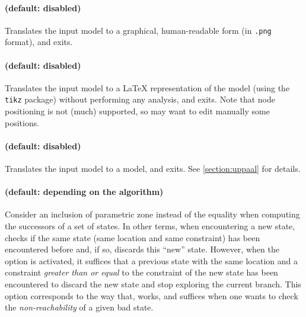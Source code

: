\paragraph{ (default: disabled)}
Translates the input model to a graphical, human-readable form (in \texttt{.png} format), and exits.

\paragraph{ (default: disabled)}
Translates the input model to a \LaTeX{} representation of the model (using the \texttt{tikz} package) without performing any analysis, and exits.
Note that node positioning is not (much) supported, so may want to edit manually some positions.

\paragraph{ (default: disabled)}
Translates the input model to a \uppaal{} model, and exits.
See \cref{section:uppaal} for details.



\paragraph{ (default: depending on the algorithm)}
Consider an inclusion of parametric zone instead of the equality when computing the successors of a set of states.
In other terms, when encountering a new state, \imitator{} checks if the same state (same location and same constraint) has been encountered before and, if so, discards this ``new'' state.
However, when the  option is activated, it suffices that a previous state with the same location and a constraint \emph{greater than or equal} to the constraint of the new state has been encountered to discard the new state and stop exploring the current branch.
This option corresponds to the way that, \eg{} \hytech{} works, and suffices when one wants to check the \emph{non-reachability} of a given bad state.

